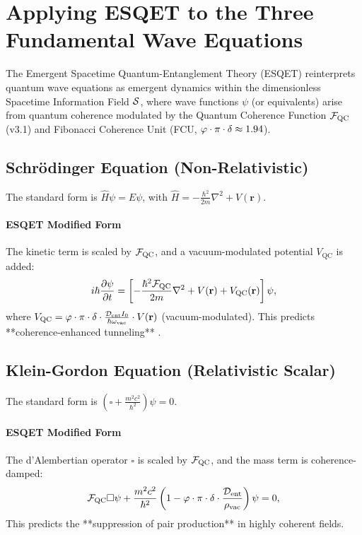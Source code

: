 
\section{Applying ESQET to the Three Fundamental Wave Equations}

The Emergent Spacetime Quantum-Entanglement Theory (ESQET) reinterprets quantum wave equations as emergent dynamics within the dimensionless Spacetime Information Field $\mathcal{S}$, where wave functions $\psi$ (or equivalents) arise from quantum coherence modulated by the Quantum Coherence Function $\mathcal{F}_{\text{QC}}$ (v3.1) and Fibonacci Coherence Unit (FCU, $\varphi \cdot \pi \cdot \mathbf{\delta} \approx 1.94$).

\subsection{Schrödinger Equation (Non-Relativistic)}

The standard form is $\hat{H} \psi = E \psi$, with $\hat{H} = -\frac{\hbar^2}{2m} \nabla^2 + V(\mathbf{r})$.

\paragraph{ESQET Modified Form}
The kinetic term is scaled by $\mathcal{F}_{\text{QC}}$, and a vacuum-modulated potential $V_{\text{QC}}$ is added:
\[
i \hbar \frac{\partial \psi}{\partial t} = \left[ -\frac{\hbar^2 \mathcal{F}_{\text{QC}}}{2m} \nabla^2 + V(\mathbf{r}) + V_{\text{QC}}(\mathbf{r}) \right] \psi,
\]
where $V_{\text{QC}} = \varphi \cdot \pi \cdot \mathbf{\delta} \cdot \frac{\mathcal{D}_{\text{ent}} I_0}{\hbar \omega_{\text{vac}}} \cdot V(\mathbf{r})$ (vacuum-modulated). This predicts **coherence-enhanced tunneling** \cite{rochaESQET}.

\subsection{Klein-Gordon Equation (Relativistic Scalar)}

The standard form is $\left( \square + \frac{m^2 c^2}{\hbar^2} \right) \psi = 0$.

\paragraph{ESQET Modified Form}
The d'Alembertian operator $\square$ is scaled by $\mathcal{F}_{\text{QC}}$, and the mass term is coherence-damped:
\[
\mathcal{F}_{\text{QC}} \square \psi + \frac{m^2 c^2}{\hbar^2} \left(1 - \varphi \cdot \pi \cdot \mathbf{\delta} \cdot \frac{\mathcal{D}_{\text{ent}}}{\rho_{\text{vac}}} \right) \psi = 0,
\]
This predicts the **suppression of pair production** in highly coherent fields.

